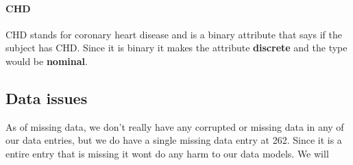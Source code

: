 \paragraph{CHD} CHD stands for coronary heart disease and is a binary attribute that says if the subject has CHD. Since it is binary it makes the attribute \textbf{discrete} and the type would be \textbf{nominal}.

\subsection{Data issues}

As of missing data, we don't really have any corrupted or missing data in any of our data entries, but we do have a single missing data entry at 262. Since it is a entire entry that is missing it wont do any harm to our data models. We will